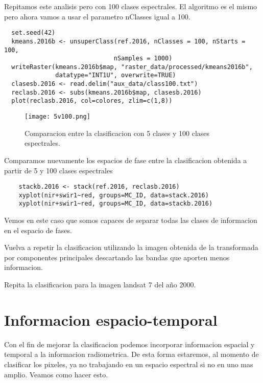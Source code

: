 \begin{exa}
  Repitamos este analisis pero con 100 clases espectrales. El algoritmo es el mismo
  pero ahora vamos a usar el parametro nClasses igual a 100.
  \begin{lstlisting}
  set.seed(42)
  kmeans.2016b <- unsuperClass(ref.2016, nClasses = 100, nStarts = 100,
                              nSamples = 1000)
  writeRaster(kmeans.2016b$map, "raster_data/processed/kmeans2016b",
              datatype="INT1U", overwrite=TRUE)
  clasesb.2016 <- read.delim("aux_data/class100.txt")
  reclasb.2016 <- subs(kmeans.2016b$map, clasesb.2016)
  plot(reclasb.2016, col=colores, zlim=c(1,8))
  \end{lstlisting}

  \begin{figure}
    \texttt{[image: 5v100.png]}
    \caption{Comparacion entre la clasificacion con 5 clases y 100 clases espectrales.}
    \label{fig:5v100}
  \end{figure}

  Comparamos nuevamente los espacios de fase entre la clasificacion obtenida a partir de 5 y 100 clases espectrales
  \begin{lstlisting}
    stackb.2016 <- stack(ref.2016, reclasb.2016)
    xyplot(nir+swir1~red, groups=MC_ID, data=stack.2016)
    xyplot(nir+swir1~red, groups=MC_ID, data=stackb.2016)
  \end{lstlisting}

  Vemos en este caso que somos capaces de separar todas las clases de informacion en el espacio de fases.

\end{exa}

\begin{act}
    Vuelva a repetir la clasificacion utilizando la imagen obtenida de la transformada por componentes principales descartando las bandas que aporten menos informacion.
\end{act}

\begin{act}
  Repita la clasificacion para la imagen landsat 7 del año 2000.
\end{act}


\section{Informacion espacio-temporal}
Con el fin de mejorar la clasificacion podemos incorporar informacion espacial y temporal a la informacion radiometrica. De esta forma estaremos, al momento de clasificar los pixeles, ya no trabajando en un espacio espectral si no en uno mas amplio. Veamos como hacer esto.

